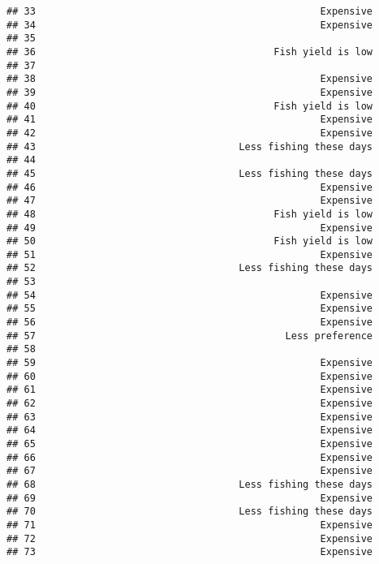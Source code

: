 \documentclass[
]{article}
\begin{document}
\begin{verbatim}
## 33                                                 Expensive
## 34                                                 Expensive
## 35                                                          
## 36                                         Fish yield is low
## 37                                                          
## 38                                                 Expensive
## 39                                                 Expensive
## 40                                         Fish yield is low
## 41                                                 Expensive
## 42                                                 Expensive
## 43                                   Less fishing these days
## 44                                                          
## 45                                   Less fishing these days
## 46                                                 Expensive
## 47                                                 Expensive
## 48                                         Fish yield is low
## 49                                                 Expensive
## 50                                         Fish yield is low
## 51                                                 Expensive
## 52                                   Less fishing these days
## 53                                                          
## 54                                                 Expensive
## 55                                                 Expensive
## 56                                                 Expensive
## 57                                           Less preference
## 58                                                          
## 59                                                 Expensive
## 60                                                 Expensive
## 61                                                 Expensive
## 62                                                 Expensive
## 63                                                 Expensive
## 64                                                 Expensive
## 65                                                 Expensive
## 66                                                 Expensive
## 67                                                 Expensive
## 68                                   Less fishing these days
## 69                                                 Expensive
## 70                                   Less fishing these days
## 71                                                 Expensive
## 72                                                 Expensive
## 73                                                 Expensive

\end{verbatim}
\end{document}
